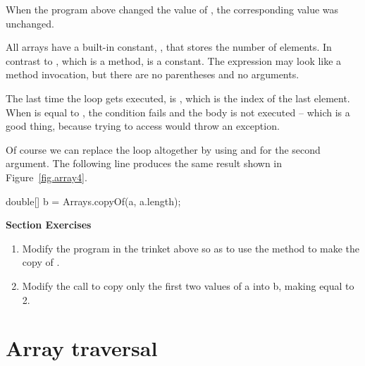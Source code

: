 When the program above changed the value of , the corresponding value  was unchanged.


%

All arrays have a built-in constant, , that stores the number of elements.
In contrast to , which is a method,  is a constant.
The expression  may look like a method invocation, but there are no parentheses and no arguments.

The last time the loop gets executed,  is , which is the index of the last element.
When  is equal to , the condition fails and the body is not executed -- which is a good thing, because trying to access  would throw an exception.

Of course we can replace the loop altogether by using  and  for the second argument.
The following line produces the same result shown in Figure~\ref{fig.array4}.

\begin{code}
double[] b = Arrays.copyOf(a, a.length);
\end{code}

\textbf{Section Exercises}
\begin{enumerate}
\item Modify the  program in the trinket above so as to use the  method to make the copy of .
\item Modify the call to copy only the first two values of a into b, making  equal to 2.
\end{enumerate}

\section{Array traversal}
\label{traversal}


